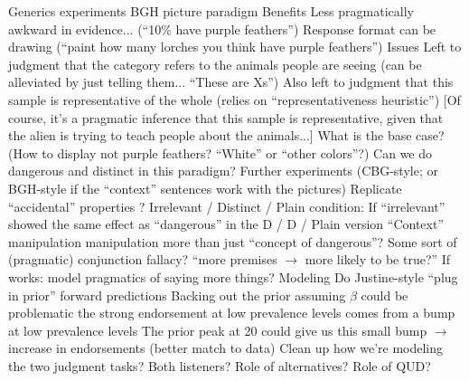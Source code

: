 \documentclass{article}
\begin{document}
\begin{outline}
		\1 Generics experiments
			\2 BGH picture paradigm
				\3 Benefits
					\4 Less pragmatically awkward in evidence... (``10\% have purple feathers'')
					\4 Response format can be drawing (``paint how many lorches you think have purple feathers'')
				\3 Issues
					\4 Left to judgment that the category refers to the animals people are seeing (can be alleviated by just telling them... ``These are Xs'')
					\4 Also left to judgment that this sample is representative of the whole (relies on ``representativeness heuristic'') [Of course, it's a pragmatic inference that this sample is representative, given that the alien is trying to teach people about the animals...]
					\4 What is the base case? (How to display not purple feathers? ``White'' or ``other colors''?)
					\4 Can we do dangerous and distinct in this paradigm?
			\2 Further experiments (CBG-style; or BGH-style if the ``context'' sentences work with the pictures)
				\3 Replicate ``accidental'' properties ?
				\3 Irrelevant / Distinct / Plain condition: If ``irrelevant'' showed the same effect as ``dangerous'' in the D / D / Plain version
					\4 ``Context'' manipulation manipulation more than just ``concept of dangerous''?
					\4  Some sort of (pragmatic) conjunction fallacy? ``more premises $\rightarrow$ more likely to be true?''
					\4 If works: model pragmatics of saying more things?
		\1 Modeling
			\2 Do Justine-style ``plug in prior'' forward predictions
				\3 Backing out the prior assuming $\beta$ could be problematic
					\4 the strong endorsement at low prevalence levels comes from a bump at low prevalence levels
				\3 The prior peak at 20 could give us this small bump $\rightarrow$ increase in endorsements (better match to data)
			\2 Clean up how we're modeling the two judgment tasks? Both listeners?
				\3 Role of alternatives?
				\3 Role of QUD?
				
					
					

\end{outline}
\end{document}
